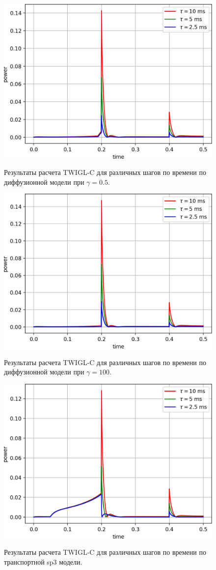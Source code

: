 \documentclass{crm-article}
\begin{document}
\begin{figure}[ht]
\begin{center}
	\includegraphics[width=0.5\linewidth]{dif_tau_c.png}\\
	\caption{\label{image:canonsummary}Результаты расчета TWIGL-C для различных шагов по времени по диффузионной модели при $\gamma=0.5$.}
	\label{ris:dif_tau_c_0.5}
\end{center}
\end{figure}

\begin{figure}[ht]
\begin{center}
	\includegraphics[width=0.5\linewidth]{dif_tau_c_100.png}\\
	\caption{\label{image:canonsummary}Результаты расчета TWIGL-C для различных шагов по времени по диффузионной модели при $\gamma=100$.}
	\label{ris:dif_tau_c_100}
\end{center}
\end{figure}

\begin{figure}[ht]
\begin{center}
	\includegraphics[width=0.5\linewidth]{sp3_tau_c.png}\\
	\caption{\label{image:canonsummary}Результаты расчета TWIGL-C для различных шагов по времени по транспортной sp3 модели.}
	\label{ris:sp3_tau_c}
\end{center}
\end{figure}
	
\end{document}
